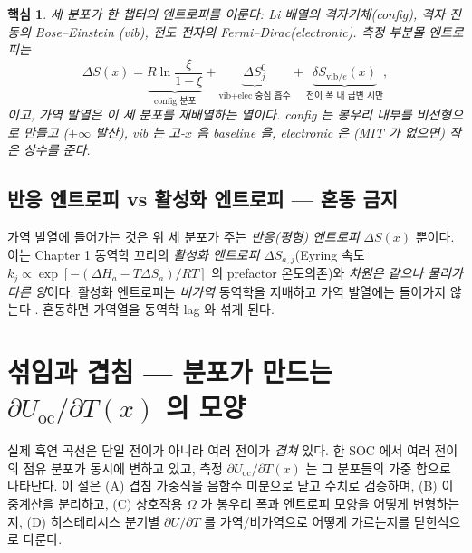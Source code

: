 \documentclass[11pt,a4paper]{article}
\newtheorem*{keybox}{핵심}
\newcommand{\oc}{\mathrm{oc}}
\newcommand{\vib}{\mathrm{vib}}
\begin{document}
\begin{keybox}
세 분포가 한 챕터의 엔트로피를 이룬다: Li 배열의 \emph{격자기체}(config), 격자 진동의 \emph{Bose--Einstein}
(vib), 전도 전자의 \emph{Fermi--Dirac}(electronic). 측정 부분몰 엔트로피는
\[
\Delta S(x)=\underbrace{R\ln\frac{\xi}{1-\xi}}_{\text{config 분포}}
+\underbrace{\Delta S^0_j}_{\text{vib+elec 중심 흡수}}
+\underbrace{\delta S_{\vib/e}(x)}_{\text{전이 폭 내 급변 시만}},
\]
이고, 가역 발열은 이 세 분포를 재배열하는 열이다. config 는 봉우리 \emph{내부}를 비선형으로 만들고
($\pm\infty$ 발산), vib 는 고-$x$ 음 baseline 을, electronic 은 (MIT 가 없으면) 작은 상수를 준다.
\end{keybox}

\subsection{반응 엔트로피 vs 활성화 엔트로피 — 혼동 금지}
가역 발열에 들어가는 것은 위 세 분포가 주는 \emph{반응(평형) 엔트로피} $\Delta S(x)$ 뿐이다. 이는 Chapter 1
동역학 꼬리의 \emph{활성화 엔트로피} $\Delta S_{a,j}$(Eyring 속도 $k_j\propto\exp[-(\Delta H_a-T\Delta S_a)/RT]$
의 prefactor 온도의존)와 \emph{차원은 같으나 물리가 다른 양}이다. 활성화 엔트로피는 \emph{비가역} 동역학을
지배하고 가역 발열에는 들어가지 않는다 \cite{msmr_partI}. 혼동하면 가역열을 동역학 lag 와 섞게 된다.

\section{섞임과 겹침 — 분포가 만드는 $\partial U_\oc/\partial T(x)$ 의 모양}\label{sec:mixing}
실제 흑연 곡선은 단일 전이가 아니라 여러 전이가 \emph{겹쳐} 있다. 한 SOC 에서 여러 전이의 점유 분포가 동시에
변하고 있고, 측정 $\partial U_\oc/\partial T(x)$ 는 그 분포들의 가중 합으로 나타난다. 이 절은 (A) 겹침 가중식을
음함수 미분으로 닫고 수치로 검증하며, (B) 이중계산을 분리하고, (C) 상호작용 $\Omega$ 가 봉우리 폭과 엔트로피
모양을 어떻게 변형하는지, (D) 히스테리시스 분기별 $\partial U/\partial T$ 를 가역/비가역으로 어떻게 가르는지를
닫힌식으로 다룬다.
\end{document}
